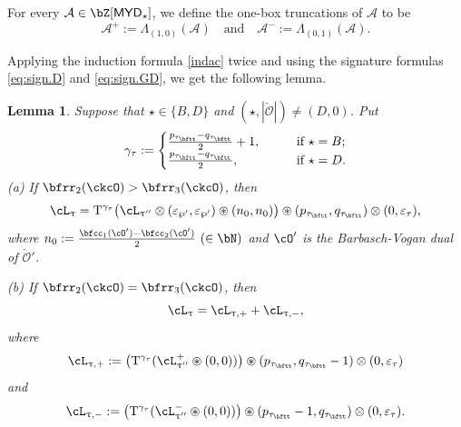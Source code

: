 \documentclass[11pt,a4paper]{amsart}
\def\MYD{{\mathsf{MYD}}}
\def\abs#1{\left|{#1}\right|}
\newcommand{\CA}{{\mathcal {A}}}
\newcommand{\CO}{{\mathcal {O}}}
\newcommand{\be}{\begin {equation}}
\newcommand{\ee}{\end {equation}}
\numberwithin{equation}{section}
\newtheorem{lem}[thm]{Lemma}
\theoremstyle{remark}
\def\uptaupp{\uptau^{\prime\prime}}
\def\maltese{\mathrm{T}}
\def\MYD{{\mathsf{MYD}}}
\def\AND{\quad\text{and}\quad}
\def\pac#1{\ac_{#1}^+}
\def\nac#1{\ac_{#1}^-}
\def\ac{\cL}
\def\lotimes{\otimes}
\begin{document}
For every  $\CA\in \bZ[\MYD_{\star}]$, we define the one-box truncations of $\CA$ to be 
\[
\CA^{+} := \Lambda_{(1,0)}(\CA) \AND \CA^{-} := \Lambda_{(0,1)}(\CA).
\]

Applying the induction formula \eqref{indac} twice and using the signature formulas \eqref{eq:sign.D} and \eqref{eq:sign.GD}, we get the following lemma. 
\begin{lem}\label{lem:dlift00}
 Suppose that $\star\in\{B,D\}$ and $(\star, \abs{\check \CO})\neq (D, 0)$. Put 
\be\label{gammatau}
   \gamma_\tau:=\begin{cases}
   \frac{p_{\tau_\bftt}-q_{\tau_\bftt}}{2}+1, \qquad & \textrm{if $\star=B$};\\
    \frac{p_{\tau_\bftt}-q_{\tau_\bftt}}{2}, \qquad &\textrm{if $\star=D$}.
   \end{cases}
    \ee
\noindent (a) 
 If  $\bfrr_{2}(\ckcO)>\bfrr_{3}(\ckcO)$, then
  \begin{equation}\label{eq:BD}
    \ac_{\uptau}= \maltese^{\gamma_\tau}\big(\ac_{\uptau''}\otimes (\varepsilon_{\wp'}, \varepsilon_{\wp'})\circledast (n_0,n_0)\big)\circledast (p_{\tau_{\bftt}},q_{\tau_{\bftt}})
    \lotimes (0,\varepsilon_{\tau}),
  \end{equation}
 where $n_0:=\frac{\bfcc_{1}(\cO')-\bfcc_{2}(\cO')}{2}\ (\in \bN)$ and $\cO'$ is the Barbasch-Vogan dual of $\check \CO'$.
  
  
\noindent (b) 
 If  $\bfrr_{2}(\ckcO)=\bfrr_{3}(\ckcO)$,
  then
\be\label{decac}
    \ac_{\uptau} =
    \ac_{\uptau,+}+\ac_{\uptau,-},
\ee
    where 
  \begin{equation}\label{eq:BD201}
    \ac_{\uptau,+}:=\big(\maltese^{\gamma_\tau} (\pac{\uptaupp}\circledast (0,0))\big) \circledast (p_{\tau_{\bftt}},q_{\tau_{\bftt}}-1)\lotimes(0,\varepsilon_{\tau})
    \end{equation}
    and
      \begin{equation}\label{eq:BD202}
    \ac_{\uptau,-}:= \big(\maltese^{\gamma_\tau}(\nac{\uptaupp}\circledast (0,0)) \big) \circledast (p_{\tau_{\bftt}}-1,q_{\tau_{\bftt}})
    \lotimes(0,\varepsilon_{\tau}).
  \end{equation} %
  \end{lem}
  
\end{document}
